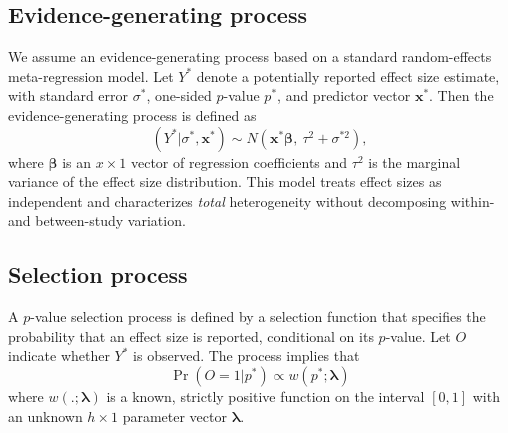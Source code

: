 \documentclass[
  american,
  man, donotrepeattitle,floatsintext]{apa7}
\begin{document}
\subsection{Evidence-generating process}\label{evidence-generating-process}

We assume an evidence-generating process based on a standard random-effects meta-regression model. Let \(Y^*\) denote a potentially reported effect size estimate, with standard error \(\sigma^*\), one-sided \(p\)-value \(p^*\), and predictor vector \(\mathbf{x}^*\). Then the evidence-generating process is defined as
\begin{equation}
\label{eq:meta-mean-regression}
\left(Y^* | \sigma^*, \mathbf{x}^*\right) \sim N\left(\mathbf{x}^* \boldsymbol\beta, \ \tau^2 + \sigma^{*2}\right),
\end{equation}
where \(\boldsymbol\beta\) is an \(x \times 1\) vector of regression coefficients and \(\tau^2\) is the marginal variance of the effect size distribution. This model treats effect sizes as independent and characterizes \emph{total} heterogeneity without decomposing within- and between-study variation.

\subsection{Selection process}\label{selection-process}

A \(p\)-value selection process is defined by a selection function that specifies the probability that an effect size is reported, conditional on its \(p\)-value. Let \(O\) indicate whether \(Y^*\) is observed. The process implies that
\begin{equation}
\label{eq:selection-process}
\Pr\left(O = 1 | p^* \right) \propto w\left(p^*; \boldsymbol\lambda \right)
\end{equation}
where \(w\left(.; \boldsymbol\lambda\right)\) is a known, strictly positive function on the interval \([0, 1]\) with an unknown \(h \times 1\) parameter vector \(\boldsymbol\lambda\).
\end{document}
